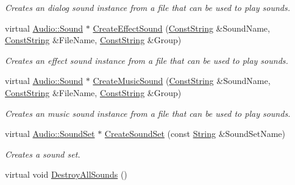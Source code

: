 \begin{DoxyCompactItemize}
\begin{DoxyCompactList}\small\item\em Creates an dialog sound instance from a file that can be used to play sounds. \item\end{DoxyCompactList}\item 
virtual \hyperlink{classMezzanine_1_1Audio_1_1Sound}{Audio::Sound} $\ast$ \hyperlink{classMezzanine_1_1AudioManager_ab2573d44cfe6e0f8e3d1f0dc794c36a5}{CreateEffectSound} (\hyperlink{namespaceMezzanine_a63cd699ac54b73953f35ec9cfc05e506}{ConstString} \&SoundName, \hyperlink{namespaceMezzanine_a63cd699ac54b73953f35ec9cfc05e506}{ConstString} \&FileName, \hyperlink{namespaceMezzanine_a63cd699ac54b73953f35ec9cfc05e506}{ConstString} \&Group)
\begin{DoxyCompactList}\small\item\em Creates an effect sound instance from a file that can be used to play sounds. \item\end{DoxyCompactList}\item 
virtual \hyperlink{classMezzanine_1_1Audio_1_1Sound}{Audio::Sound} $\ast$ \hyperlink{classMezzanine_1_1AudioManager_a157de9927fb561655b74267d9c375034}{CreateMusicSound} (\hyperlink{namespaceMezzanine_a63cd699ac54b73953f35ec9cfc05e506}{ConstString} \&SoundName, \hyperlink{namespaceMezzanine_a63cd699ac54b73953f35ec9cfc05e506}{ConstString} \&FileName, \hyperlink{namespaceMezzanine_a63cd699ac54b73953f35ec9cfc05e506}{ConstString} \&Group)
\begin{DoxyCompactList}\small\item\em Creates an music sound instance from a file that can be used to play sounds. \item\end{DoxyCompactList}\item 
virtual \hyperlink{classMezzanine_1_1Audio_1_1SoundSet}{Audio::SoundSet} $\ast$ \hyperlink{classMezzanine_1_1AudioManager_ac4a92b861868203186e7f238bd2f816c}{CreateSoundSet} (const \hyperlink{namespaceMezzanine_acf9fcc130e6ebf08e3d8491aebcf1c86}{String} \&SoundSetName)
\begin{DoxyCompactList}\small\item\em Creates a sound set. \item\end{DoxyCompactList}\item 
\hypertarget{classMezzanine_1_1AudioManager_aa9b51e38b4a9b1a1b1efce10fc10f0ee}{
virtual void \hyperlink{classMezzanine_1_1AudioManager_aa9b51e38b4a9b1a1b1efce10fc10f0ee}{DestroyAllSounds} ()}
\label{classMezzanine_1_1AudioManager_aa9b51e38b4a9b1a1b1efce10fc10f0ee}


\end{DoxyCompactItemize}

